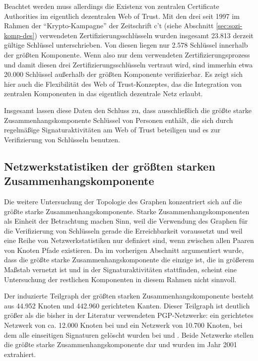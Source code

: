 Beachtet werden muss
allerdings die Existenz von zentralen Certificate Authorities im
eigentlich dezentralen Web of Trust. Mit den drei seit 1997 im Rahmen
der "`Krypto-Kampagne"' der Zeitschrift c't (siehe Abschnitt
\ref{sec:sozi-komp-des}) verwendeten Zertifizierungsschlüsseln
wurden insgesamt 23.813 derzeit gültige Schlüssel
unterschrieben. Von diesen liegen nur 2.578 Schlüssel innerhalb der
größten Komponente. Wenn also nur dem verwendeten
Zertifizierungsprozess und damit diesen drei
Zertifizierungsschlüsseln vertraut wird, sind immerhin etwa 20.000
Schlüssel außerhalb der größten Komponente verifizierbar. Es
zeigt sich hier auch die Flexibilität des Web of Trust-Konzeptes,
das die Integration von zentralen Komponenten in das eigentlich
dezentrale Netz erlaubt.

Insgesamt lassen diese Daten den Schluss zu, dass ausschließlich die
größte starke Zusammenhangskomponente Schlüssel von Personen
enthält, die sich durch regelmäßige Signaturaktivitäten am Web
of Trust beteiligen und es zur Verifizierung von Schlüsseln
benutzen. 

\subsection{Netzwerkstatistiken der größten starken
  Zusammenhangskomponente}
\label{sec:kennz-des-graph}

Die weitere Untersuchung der Topologie des Graphen konzentriert sich
auf die größte starke Zusammenhangskomponente. Starke
Zusammenhangskomponenten als Einheit der Betrachtung machen Sinn, weil
die Verwendung des Graphen für die Verifizierung von Schlüsseln
gerade die Erreichbarkeit voraussetzt und weil eine Reihe von
Netzwerkstatistiken nur definiert sind, wenn zwischen allen Paaren von
Knoten Pfade existieren. Da im vorherigen Abschnitt argumentiert
wurde, dass die größte starke Zusammenhangskomponente die einzige
ist, die in größerem Maßstab vernetzt ist und in der
Signaturaktivitäten stattfinden, scheint eine Untersuchung der
restlichen Komponenten in diesem Rahmen nicht sinnvoll.

Der induzierte Teilgraph der größten starken
Zusammenhangskomponente besteht aus 44.952 Knoten und 442.960
gerichteten Kanten. Dieser Teilgraph ist deutlich größer als die
bisher in der Literatur verwendeten PGP-Netzwerke:  ein gerichtetes
Netzwerk von ca. 12.000 Knoten bei \cite{Capkun2002} und ein Netzwerk
von 10.700 Knoten, bei dem alle einseitigen Signaturen gelöscht
wurden bei \cite{Boguna2004} und \cite{Gregory2010}. Beide Netzwerke
stellen die größte starke Zusammenhangskomponente dar und wurden im
Jahr 2001 extrahiert.

